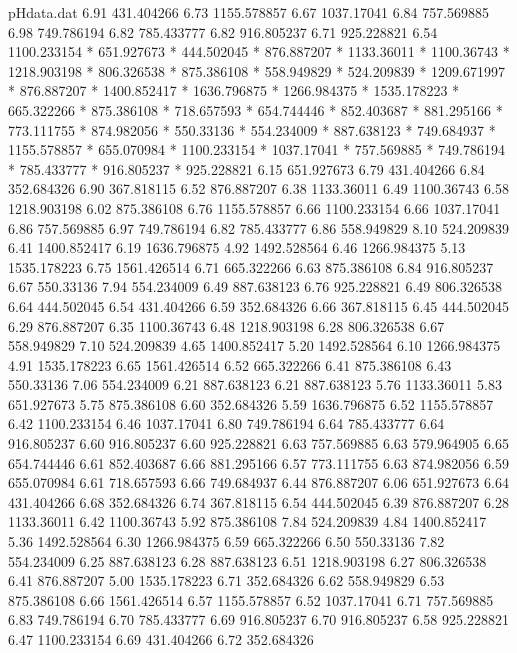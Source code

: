 \begin{filecontents}{pHdata.dat}
6.91 	431.404266
6.73 	1155.578857
6.67 	1037.17041
6.84 	757.569885
6.98 	749.786194
6.82 	785.433777
6.82 	916.805237
6.71 	925.228821
6.54 	1100.233154
*	651.927673
*	444.502045
*	876.887207
*	1133.36011
*	1100.36743
*	1218.903198
*	806.326538
*	875.386108
*	558.949829
*	524.209839
*	1209.671997
*	876.887207
*	1400.852417
*	1636.796875
*	1266.984375
*	1535.178223
*	665.322266
*	875.386108
*	718.657593
*	654.744446
*	852.403687
*	881.295166
*	773.111755
*	874.982056
*	550.33136
*	554.234009
*	887.638123
*	749.684937
*	1155.578857
*	655.070984
*	1100.233154
*	1037.17041
*	757.569885
*	749.786194
*	785.433777
*	916.805237
*	925.228821
6.15 	651.927673
6.79 	431.404266
6.84 	352.684326
6.90 	367.818115
6.52 	876.887207
6.38 	1133.36011
6.49 	1100.36743
6.58 	1218.903198
6.02 	875.386108
6.76 	1155.578857
6.66 	1100.233154
6.66 	1037.17041
6.86 	757.569885
6.97 	749.786194
6.82 	785.433777
6.86 	558.949829
8.10 	524.209839
6.41 	1400.852417
6.19 	1636.796875
4.92 	1492.528564
6.46 	1266.984375
5.13 	1535.178223
6.75 	1561.426514
6.71 	665.322266
6.63 	875.386108
6.84 	916.805237
6.67 	550.33136
7.94 	554.234009
6.49 	887.638123
6.76 	925.228821
6.49 	806.326538
6.64 	444.502045
6.54 	431.404266
6.59 	352.684326
6.66 	367.818115
6.45 	444.502045
6.29 	876.887207
6.35 	1100.36743
6.48 	1218.903198
6.28 	806.326538
6.67 	558.949829
7.10 	524.209839
4.65 	1400.852417
5.20 	1492.528564
6.10 	1266.984375
4.91 	1535.178223
6.65 	1561.426514
6.52 	665.322266
6.41 	875.386108
6.43 	550.33136
7.06 	554.234009
6.21 	887.638123
6.21 	887.638123
5.76 	1133.36011
5.83 	651.927673
5.75 	875.386108
6.60 	352.684326
5.59 	1636.796875
6.52 	1155.578857
6.42 	1100.233154
6.46 	1037.17041
6.80 	749.786194
6.64 	785.433777
6.64 	916.805237
6.60 	916.805237
6.60 	925.228821
6.63 	757.569885
6.63 	579.964905
6.65 	654.744446
6.61 	852.403687
6.66 	881.295166
6.57 	773.111755
6.63 	874.982056
6.59 	655.070984
6.61 	718.657593
6.66 	749.684937
6.44 	876.887207
6.06 	651.927673
6.64 	431.404266
6.68 	352.684326
6.74 	367.818115
6.54 	444.502045
6.39 	876.887207
6.28 	1133.36011
6.42 	1100.36743
5.92 	875.386108
7.84 	524.209839
4.84 	1400.852417
5.36 	1492.528564
6.30 	1266.984375
6.59 	665.322266
6.50 	550.33136
7.82 	554.234009
6.25 	887.638123
6.28 	887.638123
6.51 	1218.903198
6.27 	806.326538
6.41 	876.887207
5.00 	1535.178223
6.71 	352.684326
6.62 	558.949829
6.53 	875.386108
6.66 	1561.426514
6.57 	1155.578857
6.52 	1037.17041
6.71 	757.569885
6.83 	749.786194
6.70 	785.433777
6.69 	916.805237
6.70 	916.805237
6.58 	925.228821
6.47 	1100.233154
6.69 	431.404266
6.72 	352.684326

\end{filecontents}
